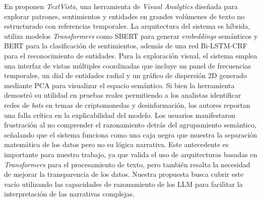En \cite{rajabiyazdi2024textvista} proponen \textit{TextVista}, una herramienta de \textit{Visual Analytics}  diseñada para explorar patrones, sentimientos y entidades en grandes volúmenes de texto no estructurado con referencias temporales. La arquitectura del sistema es híbrida, utiliza modelos \textit{Transformers} como \acs{SBERT} para generar \textit{embeddings} semánticos y \acs{BERT} para la clasificación de sentimientos, además de una red Bi-LSTM-\acs{CRF} para el reconocimiento de entidades. Para la exploración visual, el sistema emplea una interfaz de vistas múltiples coordinadas que incluye un panel de frecuencias temporales, un dial de entidades radial y un gráfico de dispersión 2D generado mediante \ac{PCA} para visualizar el espacio semántico. Si bien la herramienta demostró su utilidad en pruebas reales permitiendo a los analistas identificar redes de \textit{bots} en temas de criptomonedas y desinformación, los autores reportan una falla crítica en la explicabilidad del modelo. Los usuarios manifestaron frustración al no comprender el razonamiento detrás del agrupamiento semántico, señalando que el sistema funciona como una caja negra que muestra la separación matemática de los datos pero no su lógica narrativa. Este antecedente es importante para nuestro trabajo, ya que valida el uso de arquitecturas basadas en \textit{Transformers} para el procesamiento de texto, pero también resalta la necesidad de mejorar la transparencia de los datos. Nuestra propuesta busca cubrir este vacío utilizando las capacidades de razonamiento de los \acs{LLM} para facilitar la interpretación de las narrativas complejas.










